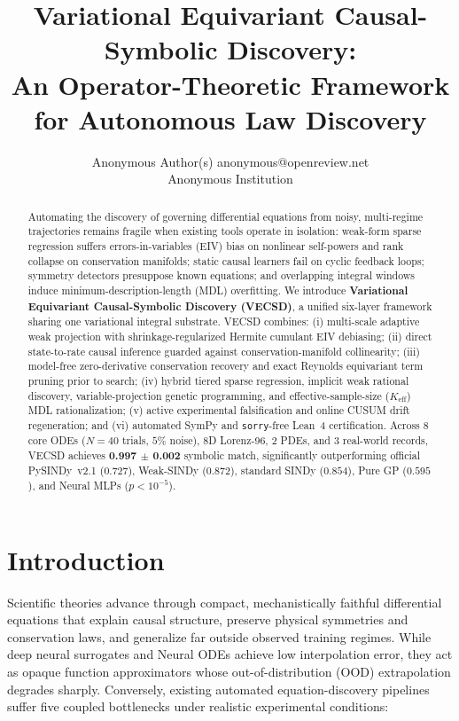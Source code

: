 \documentclass[10pt]{article} %
\title{Variational Equivariant Causal-Symbolic Discovery:\\
An Operator-Theoretic Framework for Autonomous Law Discovery}
\author{\name Anonymous Author(s) \email anonymous@openreview.net \\
      \addr Anonymous Institution}
\begin{document}
\maketitle

\begin{abstract}
Automating the discovery of governing differential equations from noisy, multi-regime trajectories remains fragile when existing tools operate in isolation: weak-form sparse regression suffers errors-in-variables (EIV) bias on nonlinear self-powers and rank collapse on conservation manifolds; static causal learners fail on cyclic feedback loops; symmetry detectors presuppose known equations; and overlapping integral windows induce minimum-description-length (MDL) overfitting. We introduce \textbf{Variational Equivariant Causal-Symbolic Discovery (VECSD)}, a unified six-layer framework sharing one variational integral substrate. VECSD combines: (i) multi-scale adaptive weak projection with shrinkage-regularized Hermite cumulant EIV debiasing; (ii) direct state-to-rate causal inference guarded against conservation-manifold collinearity; (iii) model-free zero-derivative conservation recovery and exact Reynolds equivariant term pruning prior to search; (iv) hybrid tiered sparse regression, implicit weak rational discovery, variable-projection genetic programming, and effective-sample-size ($K_{\text{eff}}$) MDL rationalization; (v) active experimental falsification and online CUSUM drift regeneration; and (vi) automated SymPy and \texttt{sorry}-free Lean~4 certification. Across 8 core ODEs ($N=40$ trials, $5\%$ noise), 8D Lorenz-96, 2 PDEs, and 3 real-world records, VECSD achieves \textbf{0.997 $\pm$ 0.002} symbolic match, significantly outperforming official PySINDy~v2.1 ($0.727$), Weak-SINDy ($0.872$), standard SINDy ($0.854$), Pure GP ($0.595$), and Neural MLPs ($p < 10^{-5}$).
\end{abstract}

\section{Introduction}
Scientific theories advance through compact, mechanistically faithful differential equations that explain causal structure, preserve physical symmetries and conservation laws, and generalize far outside observed training regimes. While deep neural surrogates and Neural ODEs achieve low interpolation error, they act as opaque function approximators whose out-of-distribution (OOD) extrapolation degrades sharply. Conversely, existing automated equation-discovery pipelines suffer five coupled bottlenecks under realistic experimental conditions:
\end{document}
